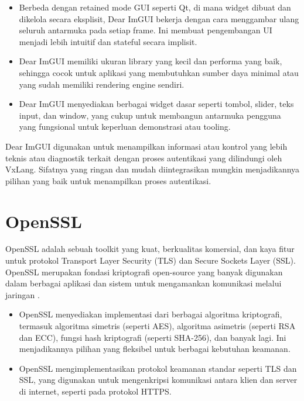\begin{itemize}
	\item {} Berbeda dengan retained mode GUI seperti Qt, di mana widget dibuat dan dikelola secara eksplisit, Dear ImGUI bekerja dengan cara menggambar ulang seluruh antarmuka pada setiap frame. Ini membuat pengembangan UI menjadi lebih intuitif dan stateful secara implisit.
	\item {} Dear ImGUI memiliki ukuran library yang kecil dan performa yang baik, sehingga cocok untuk aplikasi yang membutuhkan sumber daya minimal atau yang sudah memiliki rendering engine sendiri.
	\item {} Dear ImGUI menyediakan berbagai widget dasar seperti tombol, slider, teks input, dan window, yang cukup untuk membangun antarmuka pengguna yang fungsional untuk keperluan demonstrasi atau tooling.
\end{itemize}

Dear ImGUI digunakan untuk menampilkan informasi atau kontrol yang lebih teknis atau diagnostik terkait dengan proses autentikasi yang dilindungi oleh VxLang. Sifatnya yang ringan dan mudah diintegrasikan mungkin menjadikannya pilihan yang baik untuk menampilkan proses autentikasi.

\section{OpenSSL}
OpenSSL adalah sebuah toolkit yang kuat, berkualitas komersial, dan kaya fitur untuk protokol Transport Layer Security (TLS) dan Secure Sockets Layer (SSL). OpenSSL merupakan fondasi kriptografi open-source yang banyak digunakan dalam berbagai aplikasi dan sistem untuk mengamankan komunikasi melalui jaringan \cite{OpenSSL}.

\begin{itemize}
	\item {} OpenSSL menyediakan implementasi dari berbagai algoritma kriptografi, termasuk algoritma simetris (seperti AES), algoritma asimetris (seperti RSA dan ECC), fungsi hash kriptografi (seperti SHA-256), dan banyak lagi. Ini menjadikannya pilihan yang fleksibel untuk berbagai kebutuhan keamanan.
	\item {} OpenSSL mengimplementasikan protokol keamanan standar seperti TLS dan SSL, yang digunakan untuk mengenkripsi komunikasi antara klien dan server di internet, seperti pada protokol HTTPS.
\end{itemize}

